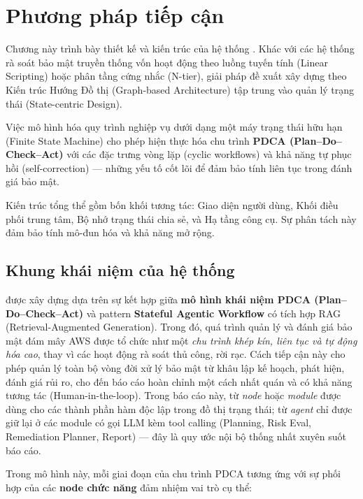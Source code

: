 \chapter{Phương pháp tiếp cận}

Chương này trình bày thiết kế và kiến trúc của hệ thống \sysname. Khác với các hệ thống rà soát bảo mật truyền thống vốn hoạt động theo luồng tuyến tính (Linear Scripting) hoặc phân tầng cứng nhắc (N-tier), giải pháp đề xuất xây dựng theo Kiến trúc Hướng Đồ thị (Graph-based Architecture) tập trung vào quản lý trạng thái (State-centric Design).

Việc mô hình hóa quy trình nghiệp vụ dưới dạng một máy trạng thái hữu hạn (Finite State Machine) cho phép hiện thực hóa chu trình \textbf{PDCA (Plan--Do--Check--Act)} với các đặc trưng vòng lặp (cyclic workflows) và khả năng tự phục hồi (self-correction) — những yếu tố cốt lõi để đảm bảo tính liên tục trong đánh giá bảo mật.

Kiến trúc tổng thể gồm bốn khối tương tác: Giao diện người dùng, Khối điều phối trung tâm, Bộ nhớ trạng thái chia sẻ, và Hạ tầng công cụ. Sự phân tách này đảm bảo tính mô-đun hóa và khả năng mở rộng.

\section{Khung khái niệm của hệ thống}
\label{sec:conceptual-framework}

\sysname{} được xây dựng dựa trên sự kết hợp giữa \textbf{mô hình khái niệm PDCA (Plan--Do--Check--Act)} và pattern \textbf{Stateful Agentic Workflow} \cite{zaharia_compound_2024} có tích hợp RAG (Retrieval-Augmented Generation). Trong đó, quá trình quản lý và đánh giá bảo mật đám mây AWS được tổ chức như một \textit{chu trình khép kín, liên tục và tự động hóa cao}, thay vì các hoạt động rà soát thủ công, rời rạc. Cách tiếp cận này cho phép quản lý toàn bộ vòng đời xử lý bảo mật từ khâu lập kế hoạch, phát hiện, đánh giá rủi ro, cho đến báo cáo hoàn chỉnh một cách nhất quán và có khả năng tương tác (Human-in-the-loop). Trong báo cáo này, từ \textit{node} hoặc \textit{module} được dùng cho các thành phần hàm độc lập trong đồ thị trạng thái; từ \textit{agent} chỉ được giữ lại ở các module có gọi LLM kèm tool calling (Planning, Risk Eval, Remediation Planner, Report) --- đây là quy ước nội bộ thống nhất xuyên suốt báo cáo.

Trong mô hình này, mỗi giai đoạn của chu trình PDCA tương ứng với sự phối hợp của các \textbf{node chức năng} đảm nhiệm vai trò cụ thể:

